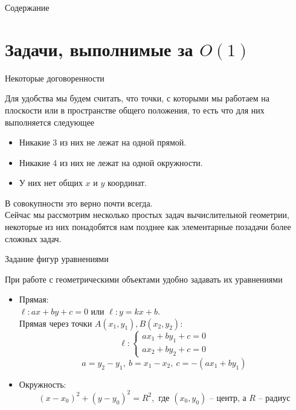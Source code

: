 \documentclass[12pt,aspectratio=169,svgnames]{beamer}
\begin{document}
 \maketitle

\begin{frame}{Содержание}
	\tableofcontents
\end{frame}

\section{Задачи, выполнимые за $O(1)$}
\begin{frame}{Некоторые договоренности}

	Для удобства мы будем считать, что точки, с которыми мы работаем на плоскости или в пространстве
	\alert{общего положения}, то есть что для них выполняется следующее

	\begin{itemize}
		\item Никакие 3 из них не лежат на одной прямой.

		\item Никакие 4 из них не лежат на одной окружности.

		\item У них нет общих $x$ и $y$ координат.
	\end{itemize}

	В совокупности это верно почти всегда.\\

	Сейчас мы рассмотрим несколько простых задач вычислительной геометрии, некоторые из них понадобятся нам позднее как
	элементарные позадачи более сложных задач.

\end{frame}

\begin{frame}{Задание фигур уравнениями}

	При работе с геометрическими объектами удобно задавать их уравнениями

		\begin{itemize}
			\item Прямая:\\

			$\ell\colon ax + by + c = 0$ или $\ell\colon y = kx + b$.\\
			Прямая через точки $A(x_1, y_1), B(x_2, y_2)$:
			\[ \ell\colon \begin{cases} ax_1 + by_1 + c = 0 \\ ax_2 + by_2 + c = 0 \end{cases}\]
			\[ a = y_2 - y_1, \ b = x_1 - x_2, \ c = -(ax_1 + by_1)\]

			\item Окружность:
			\[ (x - x_0)^2 + (y - y_0)^2 = R^2, \text{ где } (x_0, y_0) \text{ -- центр, а } R \text{ -- радиус} \]
		\end{itemize}

\end{frame}
\end{document}
